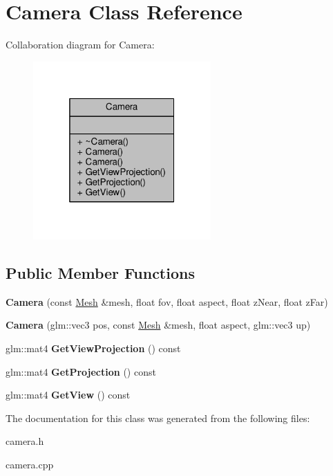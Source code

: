 \hypertarget{class_camera}{}\section{Camera Class Reference}
\label{class_camera}


Collaboration diagram for Camera\+:
\nopagebreak
\begin{figure}[H]
\begin{center}
\leavevmode
\includegraphics[width=193pt]{class_camera__coll__graph}
\end{center}
\end{figure}
\subsection*{Public Member Functions}
\begin{DoxyCompactItemize}
\item 
{\bfseries Camera} (const \hyperlink{class_mesh}{Mesh} \&mesh, float fov, float aspect, float z\+Near, float z\+Far)\hypertarget{class_camera_ace593335719e93de3737f5198fc6d61e}{}\label{class_camera_ace593335719e93de3737f5198fc6d61e}

\item 
{\bfseries Camera} (glm\+::vec3 pos, const \hyperlink{class_mesh}{Mesh} \&mesh, float aspect, glm\+::vec3 up)\hypertarget{class_camera_adca502e8d99559c3e15d224c826d482c}{}\label{class_camera_adca502e8d99559c3e15d224c826d482c}

\item 
glm\+::mat4 {\bfseries Get\+View\+Projection} () const \hypertarget{class_camera_a7ab7d6e30a473392949f993856b14517}{}\label{class_camera_a7ab7d6e30a473392949f993856b14517}

\item 
glm\+::mat4 {\bfseries Get\+Projection} () const \hypertarget{class_camera_adb63c52b3975a50b512761317758b830}{}\label{class_camera_adb63c52b3975a50b512761317758b830}

\item 
glm\+::mat4 {\bfseries Get\+View} () const \hypertarget{class_camera_aca3834159d8421515e96c9e00e8d2e7b}{}\label{class_camera_aca3834159d8421515e96c9e00e8d2e7b}

\end{DoxyCompactItemize}


The documentation for this class was generated from the following files\+:\begin{DoxyCompactItemize}
\item 
camera.\+h\item 
camera.\+cpp\end{DoxyCompactItemize}
